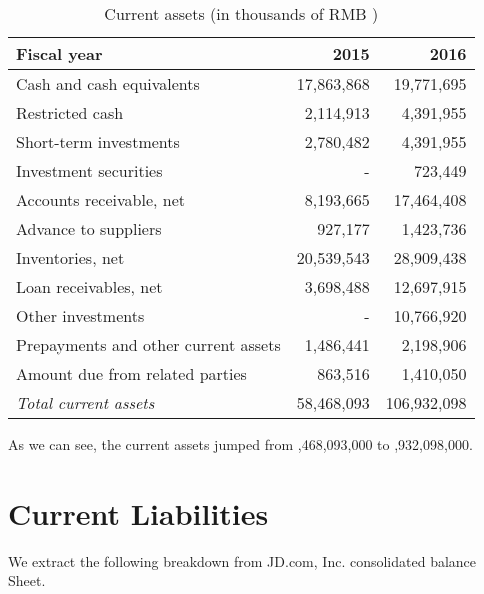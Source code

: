 \begin{table}[H]	
\begin{center}
	\begin{tabular}{lrr}
		\toprule
		\textbf{Fiscal year}&\textbf{2015}&\textbf{2016}\\
		\midrule
		Cash and cash equivalents&17,863,868&19,771,695\\
		Restricted cash&2,114,913&4,391,955\\
		Short-term investments&2,780,482&4,391,955\\
		Investment securities&-&723,449\\
		Accounts receivable, net&8,193,665&17,464,408\\
		Advance to suppliers&927,177&1,423,736\\
		Inventories, net&20,539,543&28,909,438\\
		Loan receivables, net&3,698,488&12,697,915\\
		Other investments&-&10,766,920\\
		Prepayments and other current assets&1,486,441&2,198,906\\
		Amount due from related parties&863,516&1,410,050\\
		\qquad\emph{Total current assets}&58,468,093&106,932,098\\
		\bottomrule
	\end{tabular}
\end{center}
	\caption{Current assets (in thousands of RMB \textyen)}\label{table:1}
\end{table}
As we can see, the current assets jumped from ,468,093,000 to ,932,098,000.

\section{Current Liabilities}

We extract the following breakdown from JD.com, Inc. consolidated balance Sheet.\\
 
